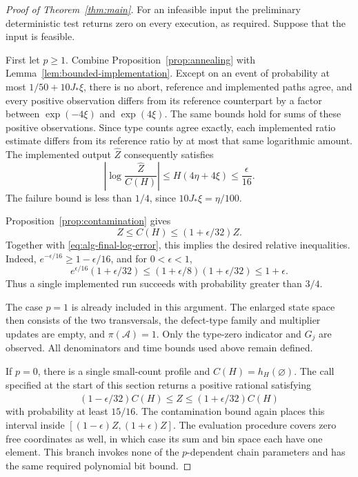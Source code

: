 \begin{proof}[Proof of Theorem~\ref{thm:main}]
For an infeasible input the preliminary deterministic test returns
zero on every execution, as required.  Suppose that the input is
feasible.

First let \(p\geq 1\).  Combine
Proposition~\ref{prop:annealing} with
Lemma~\ref{lem:bounded-implementation}.  Except on an event of
probability at most \(1/50+10J_*\xi\), there is no abort,
reference and implemented paths agree, and every positive
observation differs from its reference counterpart by a factor
between \(\exp(-4\xi)\) and \(\exp(4\xi)\).  The same bounds
hold for sums of these positive observations.  Since type counts
agree exactly, each implemented ratio estimate differs from its
reference ratio by at most that same logarithmic amount.  The
implemented output \(\widehat Z\) consequently satisfies
\begin{equation}
 \left|\log\frac{\widehat Z}{C(H)}\right|
 \leq H(4\eta+4\xi)\leq\frac{\epsilon}{16}.
 \label{eq:alg-final-log-error}
\end{equation}
The failure bound is less than \(1/4\), since
\(10J_*\xi=\eta/100\).

Proposition~\ref{prop:contamination} gives
\[
 Z\leq C(H)\leq (1+\epsilon/32)Z.
\]
Together with \eqref{eq:alg-final-log-error}, this implies the
desired relative inequalities.  Indeed,
\(e^{-\epsilon/16}\geq 1-\epsilon/16\), and for
\(0<\epsilon<1\),
\[
 e^{\epsilon/16}(1+\epsilon/32)
 \leq (1+\epsilon/8)(1+\epsilon/32)
 \leq 1+\epsilon.
\]
Thus a single implemented run succeeds with probability greater
than \(3/4\).

The case \(p=1\) is already included in this argument.  The
enlarged state space then consists of the two transversals, the
defect-type family and multiplier updates are empty, and
\(\pi(\mathcal A)=1\).  Only the type-zero indicator and
\(G_j\) are observed.  All denominators and time bounds used
above remain defined.

If \(p=0\), there is a single small-count profile and
\(C(H)=h_H(\varnothing)\).  The call specified at the start of
this section returns a positive rational satisfying
\[
 (1-\epsilon/32)C(H)
 \leq \widehat Z
 \leq (1+\epsilon/32)C(H)
\]
with probability at least \(15/16\).  The contamination bound
again places this interval inside
\([(1-\epsilon)Z,(1+\epsilon)Z]\).  The evaluation procedure
covers zero free coordinates as well, in which case its sum and
bin space each have one element.  This branch invokes none of
the \(p\)-dependent chain parameters and has the same required
polynomial bit bound.


\end{proof}
